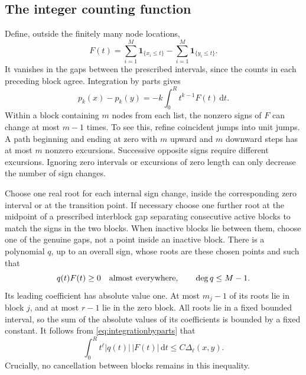 \documentclass[11pt,a4paper]{article}
\numberwithin{equation}{section}
\theoremstyle{definition}
\theoremstyle{remark}
\newcommand{\dd}{\,\mathrm d}
\newcommand{\ind}{\mathbf 1}
\begin{document}
\subsection{The integer counting function}
Define, outside the finitely many node locations,
\begin{equation}
 F(t)=\sum_{i=1}^M\ind_{\{x_i\le t\}}-
       \sum_{i=1}^M\ind_{\{y_i\le t\}}.
\end{equation}
It vanishes in the gaps between the prescribed intervals, since the counts
in each preceding block agree. Integration by parts gives
\begin{equation}
 p_k(x)-p_k(y)=-k\int_0^R t^{k-1}F(t)\dd t.
 \label{eq:integrationbyparts}
\end{equation}
Within a block containing $m$ nodes from each list, the nonzero signs of $F$
can change at most $m-1$ times. To see this, refine coincident jumps into unit
jumps. A path beginning and ending at zero with $m$ upward and $m$ downward
steps has at most $m$ nonzero excursions. Successive opposite signs require
different excursions. Ignoring zero intervals or excursions of zero length
can only decrease the number of sign changes.

Choose one real root for each internal sign change, inside the corresponding
zero interval or at the transition point. If necessary choose one further
root at the midpoint of a prescribed interblock gap separating consecutive
active blocks to match the signs in the two blocks. When inactive blocks
lie between them, choose one of the genuine gaps, not a point inside an
inactive block. There is a polynomial $q$, up to an overall
sign, whose roots are these chosen points and such that
\begin{equation}
 q(t)F(t)\ge0\quad\hbox{almost everywhere},\qquad \deg q\le M-1.
 \label{eq:signpoly}
\end{equation}
Its leading coefficient has absolute value one. At most $m_j-1$ of its roots
lie in block $j$, and at most $r-1$ lie in the zero block. All roots lie in a
fixed bounded interval, so the sum of the absolute values of its coefficients
is bounded by a fixed constant. It follows from
\eqref{eq:integrationbyparts} that
\begin{equation}
 \int_0^R t^\ell |q(t)|\,|F(t)|\dd t\le C\Delta_\ell(x,y).
 \label{eq:weightedbudget}
\end{equation}
Crucially, no cancellation between blocks remains in this inequality.
\end{document}
